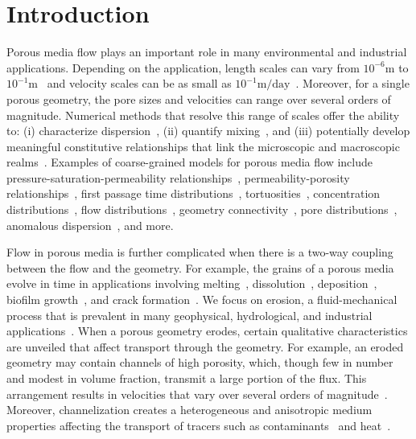 \documentclass[preprint,10pt]{elsarticle}
\begin{document}
\section{Introduction}
\label{sec:intro}
Porous media flow plays an important role in many environmental and
industrial applications.  Depending on the application, length scales
can vary from $10^{-6}\mathrm{m}$ to
$10^{-1}\mathrm{m}$~\cite{mil-chr-imh-mcb-ped1998} and velocity scales
can be as small as $10^{-1}\mathrm{m/day}$~\cite{kut-scr-dav-ham1995}.
Moreover, for a single porous geometry, the pore sizes and velocities
can range over several orders of magnitude.  Numerical methods that
resolve this range of scales offer the ability to: (i) characterize
dispersion~\cite{saf1959}, (ii) quantify
mixing~\cite{leb-den-dav-bol-car-dec-bou2011, den-leb-eng-bij2011}, and
(iii) potentially develop meaningful constitutive relationships that
link the microscopic and macroscopic
realms~\cite{mil-chr-imh-mcb-ped1998}.  Examples of coarse-grained
models for porous media flow include pressure-saturation-permeability
relationships~\cite{mil-chr-imh-mcb-ped1998}, permeability-porosity
relationships~\cite{dar-mcc1998, car1937, won-kop-tom1984}, first
passage time distributions~\cite{ber-sch-sil2000, hym-den-hag-kan2019,
cve-che-wen1996}, tortuosities~\cite{hak-com-den2019, mat-kha-koz2008,
dud-koz-mat2011, kop-kat-tim1996}, concentration
distributions~\cite{ica-den2019, bel-sal-rin1992}, flow
distributions~\cite{ali-par-wei-bre2017}, geometry
connectivity~\cite{knu-car2005, wes-blo-gra2001}, pore
distributions~\cite{ali-par-wei-bre2017}, anomalous
dispersion~\cite{dea-qua-bir-jua2018, den-cor-sch-ber2004,
sie-ili-pri-riv-gua2019}, and more.  

Flow in porous media is further complicated when there is a two-way
coupling between the flow and the geometry. For example, the grains of a
porous media evolve in time in applications involving
melting~\cite{bec-vis1998, rycroft2016asymmetric, jambon2018singular, favier2019rayleigh, morrow2019moving}, dissolution~\cite{kan-zha-che-he2002, mac2015shape, moo2017, wykes2018self}, deposition~\cite{joh-eli1995,
hewett2018modelling}, biofilm growth~\cite{tan-val-wer2015}, and crack
formation~\cite{cho2019crack}. We focus on erosion, a fluid-mechanical
process that is prevalent in many geophysical, hydrological, and
industrial applications~\cite{berhanu2012shape, hewett2017evolution, lachaussee2018competitive, lopez2018cfd, allen2019sde, amin2019role}.  When a porous geometry erodes, certain qualitative characteristics are unveiled that affect transport through the geometry.  For example, an eroded geometry may
contain channels of high porosity, which, though few in number and
modest in volume fraction, transmit a large portion of the flux. This
arrangement results in velocities that vary over several orders of
magnitude~\cite{all-hea-lab-rei2002}.  Moreover, channelization creates
a heterogeneous and anisotropic medium properties affecting the
transport of tracers such as contaminants~\cite{cve-che-wen1996,
dag1987, kon-bre1978} and heat~\cite{nil-sto1990, ree-sto1995}.
\end{document}
